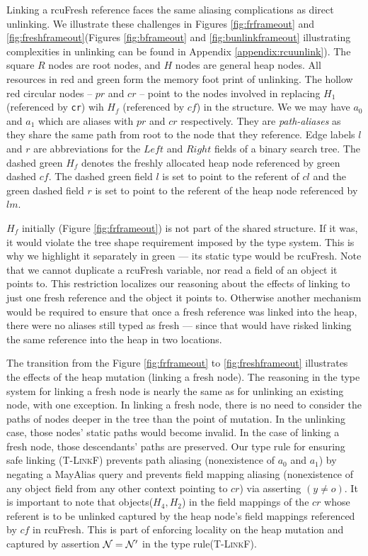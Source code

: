 Linking a \textsf{rcuFresh} reference faces the same aliasing complications as direct unlinking.
We illustrate these challenges in Figures \ref{fig:frframeout} and \ref{fig:freshframeout}(Figures \ref{fig:bframeout} and \ref{fig:bunlinkframeout} illustrating complexities in unlinking can be found in Appendix \ref{appendix:rcuunlink}).
The square $R$ nodes are root nodes, and $H$ nodes are general heap nodes.
All resources in red and green form the memory foot print of unlinking. The hollow red circular nodes -- $pr$ and $cr$ -- point to the nodes involved in replacing $H_1$ (referenced by \texttt{cr}) wih $H_f$ (referenced by $cf$) in the structure.
We we may have $a_0$ and $a_1$ which are aliases with $pr$ and $cr$ respectively. They are \textit{path-aliases} as they share the same path from root to the node that they reference. 
Edge labels $l$ and $r$ are abbreviations for the $Left$ and $Right$ fields of a binary search tree.
The dashed green $H_f$ denotes the freshly allocated heap node referenced by green dashed  $cf$. The dashed green field $l$ is set to point to the referent of $cl$ and the green dashed field $r$ is set to point to the referent of the heap node referenced by $lm$.

$H_f$ initially (Figure \ref{fig:frframeout}) is not part of the shared structure.  If it was, it would violate the tree shape requirement imposed by the type system.  This is why we highlight it separately in green --- its static type would be \textsf{rcuFresh}.
Note that we cannot duplicate a \textsf{rcuFresh} variable, nor read a field of an object it points to.
This restriction localizes our reasoning about the effects of linking to just one fresh reference and the object it points to.
Otherwise another mechanism would be required to ensure that once a fresh reference was linked into the heap, there were no aliases still typed as fresh --- since that would have risked linking the same reference into the heap in two locations.

The transition from the Figure \ref{fig:frframeout} to \ref{fig:freshframeout} illustrates the effects of the heap mutation (linking a fresh node). The reasoning in the type system for linking a fresh node is nearly the same as for unlinking an existing node, with one exception.
In linking a fresh node, there is no need to consider the paths of nodes deeper in the tree than the point of mutation.  In the unlinking case, those nodes' static paths would become invalid.  In the case of linking a fresh node, those descendants' paths are preserved.
Our type rule for ensuring safe linking (\textsc{T-LinkF}) prevents path aliasing (nonexistence of $a_0$ and $a_1$) by negating a \textsf{MayAlias} query and prevents field mapping aliasing (nonexistence of any object field from any other context pointing to $cr$) via asserting $(y\neq o)$. It is important to note that objects($H_4,H_2$) in the field mappings of the $cr$ whose referent is to be unlinked captured by the heap node's field mappings referenced by $cf$ in \textsf{rcuFresh}. This is part of enforcing locality on the heap mutation and captured by assertion $\mathcal{N} = \mathcal{N}'$ in the type rule(\textsc{T-LinkF}). 
 
